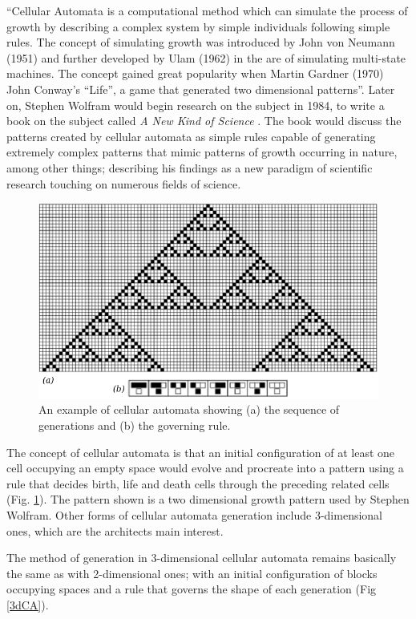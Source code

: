 ``Cellular Automata is a computational method which can simulate the process of growth by describing a complex system by simple individuals following simple rules. The concept of simulating growth was introduced by John von Neumann (1951) and further developed by Ulam (1962) in the are of simulating multi-state machines. The concept gained great popularity when Martin Gardner (1970) John Conway's ``Life'', a game that generated two dimensional patterns''\cite{krawczyk02}. Later on, Stephen Wolfram would begin research on the subject in 1984, to write a book on the subject called \emph{A New Kind of Science} \cite{wolfram02}. The book would discuss the patterns created by cellular automata as simple rules capable of generating extremely complex patterns that mimic patterns of growth occurring in nature, among other things; describing his findings as a new paradigm of scientific research touching on numerous fields of science.

\begin{figure}[htbp]
\centering
\includegraphics[width=\textwidth]{./Images/1-CellAutoEg}
\caption[Cellular Automaton]{An example of cellular automata showing (a) the sequence of generations and (b) the governing rule.\cite{wolfram02}}
\label{CAEg}
\end{figure}

The concept of cellular automata is that an initial configuration of at least one cell occupying an empty space would evolve and procreate into a pattern using a rule that decides birth, life and death cells through the preceding related cells (Fig. \ref{CAEg}). The pattern shown is a two dimensional growth pattern used by Stephen Wolfram. Other forms of cellular automata generation include 3-dimensional ones, which are the architects main interest.

The method of generation in 3-dimensional cellular automata remains basically the same as with 2-dimensional ones; with an initial configuration of blocks occupying spaces and a rule that governs the shape of each generation (Fig \ref{3dCA}).

